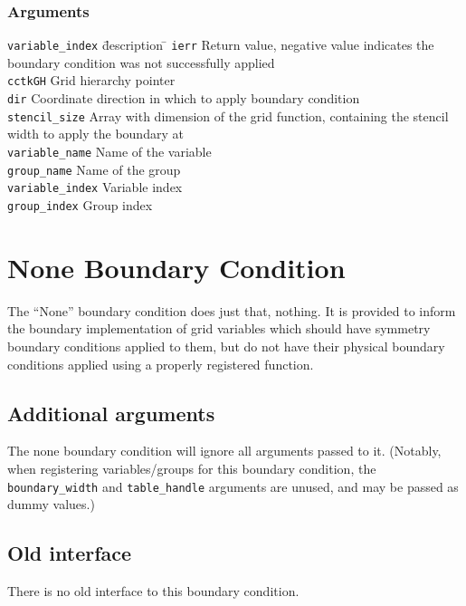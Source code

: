 \documentclass{article}
\begin{document}
\subsubsection*{Arguments}
\begin{tabbing}
{\tt variable\_index} \= description \=\kill
{\tt ierr} \> Return value, negative value indicates the
boundary condition was not successfully applied\\
{\tt cctkGH} \> Grid hierarchy pointer\\
{\tt dir} \> Coordinate direction in which to apply boundary condition\\
{\tt stencil\_size} \> Array with dimension of the grid function, containing the stencil width to apply the boundary at\\
{\tt variable\_name} \> Name of the variable\\
{\tt group\_name} \> Name of the group\\
{\tt variable\_index} \> Variable index\\
{\tt group\_index} \> Group index\\
\end{tabbing}


\section{None Boundary Condition}

The ``None'' boundary condition does just that, nothing.  It is
provided to inform the boundary implementation of grid variables which
should have symmetry boundary conditions applied to them, but do not
have their physical boundary conditions applied using a properly
registered function.

\subsection{Additional arguments}

The none boundary condition will ignore all arguments passed to it.
(Notably, when registering variables/groups for this boundary condition,
the \verb|boundary_width| and \verb|table_handle| arguments are unused,
and may be passed as dummy values.)


\subsection{Old interface}

There is no old interface to this boundary condition.
\end{document}
